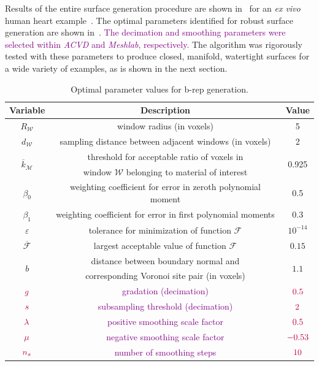 Results of the entire surface generation procedure are shown in~ for an \textit{ex vivo} human heart example~\cite{cvgg}. The optimal parameters identified for robust surface generation are shown in~. \textcolor{purple}{The decimation and smoothing parameters were selected within \textit{ACVD} and \textit{Meshlab}, respectively.} The algorithm was rigorously tested with these parameters to produce closed, manifold, watertight surfaces for a wide variety of examples, as is shown in the next section. \\

\begin{table}[h!]
 \centering
   \begin{tabular}{|c||c|c|}
   \hline 
   \textbf{Variable} & \textbf{Description} & \textbf{Value} \\ \hline \hline
   $R_{\mathcal{W}}$ & window radius (in voxels) & 5 \\ \hline
   $d_{\mathcal{W}}$ & sampling distance between adjacent windows (in voxels) & 2 \\ \hline
   \multirow{2}{*}{$\overline{k}_{\mathcal{M}}$ \rule{0mm}{4mm}} & threshold for acceptable ratio of voxels in & \multirow{2}{*}{0.925} \\
   {} & window $\mathcal{W}$ belonging to material of interest & {} \\ \hline
   $\beta_0$ & weighting coefficient for error in zeroth polynomial moment & 0.5 \\ \hline
   $\beta_1$ & weighting coefficient for error in first polynomial moments & 0.3 \\ \hline   
   $\varepsilon$ & tolerance for minimization of function $\mathcal{F}$ & $10^{-14}$ \rule{0mm}{4mm} \\ \hline
   $\overline{\mathcal{F}}$ \rule{0mm}{4mm} & largest acceptable value of function $\mathcal{F}$ & $0.15$ \\ \hline
   \multirow{2}{*}{$b$} & distance between boundary normal and & \multirow{2}{*}{$1.1$} \\
   {} & corresponding Voronoi site pair (in voxels) & {} \\ \hline
   $\color{purple}{g}$ & \textcolor{purple}{gradation (decimation)} & $\color{purple}{0.5}$ \\ \hline
   $\color{purple}{s}$ & \textcolor{purple}{subsampling threshold (decimation)} & $\color{purple}{2}$ \\ \hline
   $\color{purple}{\lambda}$ & \textcolor{purple}{positive smoothing scale factor} & $\color{purple}{0.5}$ \\ \hline
   $\color{purple}{\mu}$ & \textcolor{purple}{negative smoothing scale factor} & $\color{purple}{-0.53}$ \\ \hline
   $\color{purple}{n_s}$ & \textcolor{purple}{number of smoothing steps} & $\color{purple}{10}$ \\ \hline
\end{tabular}
\caption{Optimal parameter values for b-rep generation.}
\label{tab:Mod5}
\end{table}
